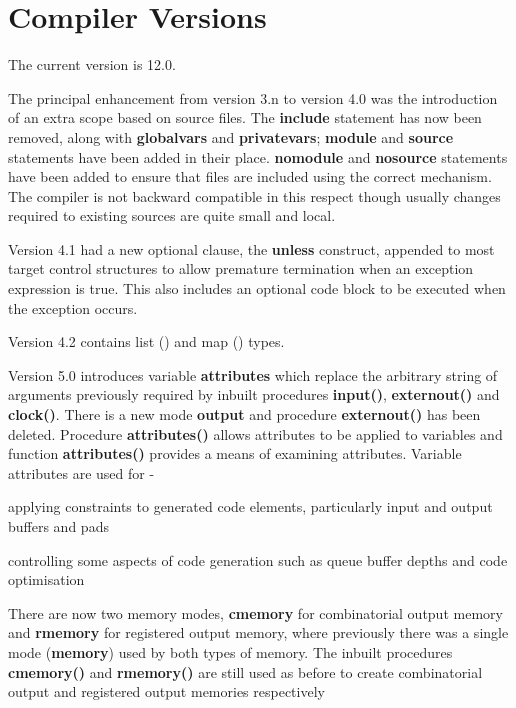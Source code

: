 \pagebreak

\chapter{Compiler Versions}

        The current version is 12.0.

        The principal enhancement from version 3.n to version 4.0 was the
        introduction of an extra scope based on source files. The {\bf include}
        statement has now been removed, along with {\bf globalvars} and {\bf
        privatevars}; {\bf module} and {\bf source} statements have been added in
        their place. {\bf nomodule} and {\bf nosource} statements have been added
        to ensure that files are included using the correct mechanism. The compiler
        is not backward compatible in this respect though usually changes required
        to existing sources are quite small and local.

        Version 4.1 had a new optional clause, the {\bf unless} construct, appended
        to most target control structures to allow premature termination when an
        exception expression is true. This also includes an optional code block
        to be executed when the exception occurs.

        Version 4.2 contains list () and map
        () types.

        Version 5.0 introduces variable {\bf attributes} which replace the
        arbitrary string of arguments previously required by inbuilt procedures
        {\bf input()}, {\bf externout()} and {\bf clock()}. There is a new mode
        {\bf output} and procedure {\bf externout()} has been deleted. Procedure
        {\bf attributes()} allows attributes to be applied to variables and
        function {\bf attributes()} provides a means of examining attributes.
        Variable attributes are used for -
        \blist
        \item   applying constraints to generated code elements, particularly
                input and output buffers and pads
        \item   controlling some aspects of code generation such as queue buffer
                depths and code optimisation
        \blend

        There are now two memory modes, {\bf cmemory} for combinatorial output
        memory and {\bf rmemory} for registered output memory, where previously
        there was a single mode ({\bf memory}) used by both types of memory. The
        inbuilt procedures {\bf cmemory()} and {\bf rmemory()} are still used as before
        to create combinatorial output and registered output memories respectively

